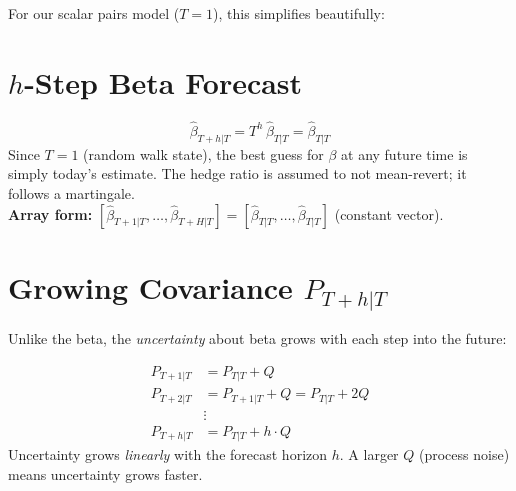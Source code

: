 \documentclass[10pt,a4paper,twocolumn]{article}
\begin{document}
\noindent For our scalar pairs model ($T=1$), this simplifies beautifully:

\section{$h$-Step Beta Forecast}

\begin{tcolorbox}[mathbox={Formula 1 --- Beta Forecast}]
\vspace{-4pt}
\begin{equation}
  \hat\beta_{T+h|T} = T^h\,\hat\beta_{T|T} = \hat\beta_{T|T}
  \label{eq:beta_fc}
\end{equation}
\vspace{-4pt}
Since $T=1$ (random walk state), the best guess for $\beta$ at any
future time is simply today's estimate.  The hedge ratio is assumed
to not mean-revert; it follows a martingale.\\[2pt]
\textbf{Array form:} $[\hat\beta_{T+1|T},\ldots,\hat\beta_{T+H|T}]
= [\hat\beta_{T|T},\ldots,\hat\beta_{T|T}]$ (constant vector).
\end{tcolorbox}

\section{Growing Covariance $P_{T+h|T}$}

Unlike the beta, the \emph{uncertainty} about beta grows with each
step into the future:

\begin{tcolorbox}[mathbox={Formula 2 --- $h$-Step Covariance}]
\vspace{-4pt}
\begin{align}
  P_{T+1|T} &= P_{T|T} + Q \\
  P_{T+2|T} &= P_{T+1|T} + Q = P_{T|T} + 2Q \\
  &\vdots\nonumber\\
  P_{T+h|T} &= P_{T|T} + h\cdot Q
  \label{eq:P_fc}
\end{align}
\vspace{-4pt}
Uncertainty grows \emph{linearly} with the forecast horizon $h$.
A larger $Q$ (process noise) means uncertainty grows faster.
\end{tcolorbox}
\end{document}
